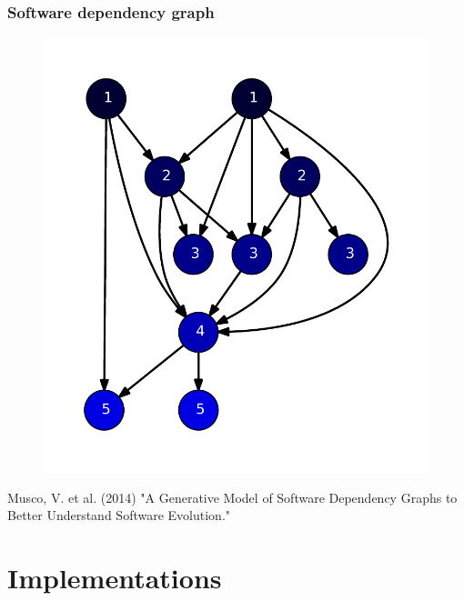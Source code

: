 \begin{frame}
\frametitle{Software dependency graph}
\begin{figure}[!hbp]
    \includegraphics[height=0.7\textheight]{img/software10.pdf}

\end{figure}
{\color{gray}\tiny Musco, V. et al. (2014) "A Generative Model of Software Dependency Graphs to Better Understand Software Evolution."}
\end{frame}


\section{Implementations}

